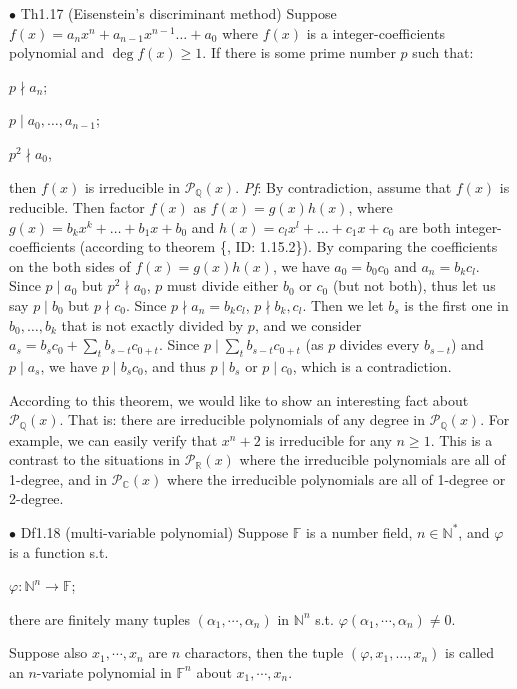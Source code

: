 \documentclass{article}
\begin{document}
\begin{Th}{$\bullet$ Th1.17 (Eisenstein's discriminant method)}
    Suppose $f(x) = a_nx^n + a_{n-1}x^{n-1}\dots + a_0$ where $f(x)$ is a integer-coefficients polynomial and $\deg f(x)\geq 1$. If there is some prime number $p$ such that:
    \begin{compactitem}
        \item $p\nmid a_n$;
        \item $p\mid a_0, \dots, a_{n-1}$;
        \item $p^2\nmid a_0$,
    \end{compactitem}
    then $f(x)$ is irreducible in $\mathcal{P}_\mathbb{Q}(x)$.
    \tcblower
    \textit{Pf}:
    By contradiction, assume that $f(x)$ is reducible. Then factor $f(x)$ as $f(x) = g(x)h(x)$, where $g(x) = b_kx^k + \dots + b_1x + b_0$ and $h(x) = c_lx^l + \dots + c_1x + c_0$ are both integer-coefficients (according to theorem \{, ID: 1.15.2\}). By comparing the coefficients on the both sides of $f(x) = g(x)h(x)$, we have $a_0 = b_0c_0$ and $a_n = b_kc_l$. Since $p\mid a_0$ but $p^2\nmid a_0$, $p$ must divide either $b_0$ or $c_0$ (but not both), thus let us say $p\mid b_0$ but $p\nmid c_0$. Since $p\nmid a_n = b_kc_l$, $p\nmid b_k, c_l$. Then we let $b_s$ is the first one in $b_0, \dots, b_k$ that is not exactly divided by $p$, and we consider $a_s = b_sc_0 + \sum_{t} b_{s-t}c_{0+t}$. Since $p\mid \sum_{t} b_{s-t}c_{0+t}$ (as $p$ divides every $b_{s-t}$) and $p\mid a_s$, we have $p\mid b_sc_0$, and thus $p\mid b_s$ or $p\mid c_0$, which is a contradiction. 
\end{Th}

\begin{Rmk}{}
    According to this theorem, we would like to show an interesting fact about $\mathcal{P}_\mathbb{Q}(x)$. That is: \textcolor{Th}{there are irreducible polynomials of any degree in $\mathcal{P}_\mathbb{Q}(x)$. For example, we can easily verify that $x^n+2$ is irreducible for any $n\geq 1$.} This is a contrast to the situations in $\mathcal{P}_\mathbb{R}(x)$ where the irreducible polynomials are all of 1-degree, and in $\mathcal{P}_\mathbb{C}(x)$ where the irreducible polynomials are all of 1-degree or 2-degree.
\end{Rmk}

\begin{Df}{$\bullet$ Df1.18 (multi-variable polynomial)}
    Suppose $\mathbb{F}$ is a number field, $n\in\mathbb{N}^\ast$, and $\varphi$ is a function s.t. 
    \begin{compactenum}
        \item $\varphi: \mathbb{N}^n\rightarrow\mathbb{F}$;
        \item there are finitely many tuples $(\alpha_1, \cdots, \alpha_n)$ in $\mathbb{N}^n$ s.t. $\varphi(\alpha_1, \cdots, \alpha_n)\neq 0$. 
    \end{compactenum}
    Suppose also $x_1, \cdots, x_n$ are $n$ charactors, then the tuple $(\varphi, x_1, \dots, x_n)$ is called an $n$-variate polynomial in $\mathbb{F}^n$ about $x_1, \cdots, x_n$.
\end{Df}
\end{document}
